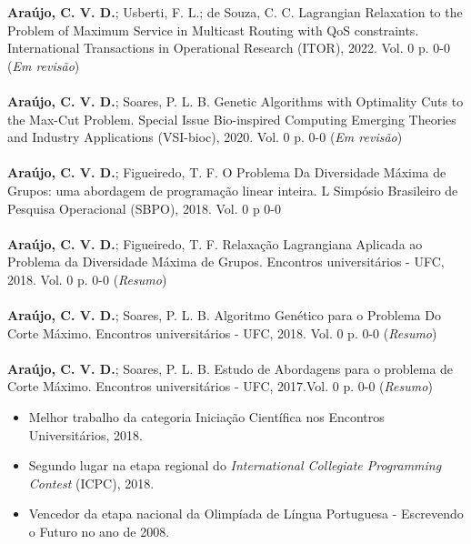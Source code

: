 \documentclass[10pt,a4paper,ragged2e,withhyper]{altacv}
\begin{document}
\begin{paracol}{1}
        \medskip
    	    \textbf{Araújo, C. V. D.}; Usberti, F. L.; de Souza, C. C.
    	    \textcolor{SecondaryColor}{Lagrangian Relaxation to the Problem of Maximum Service in Multicast Routing with QoS constraints}. International Transactions in Operational Research (ITOR), 2022. Vol. 0 p. 0-0 (\emph{Em revisão}) \\
    	    \divider \\
    		\textbf{Araújo, C. V. D.}; Soares, P. L. B.
    	    \textcolor{SecondaryColor}{Genetic Algorithms with Optimality Cuts to the Max-Cut Problem}. Special Issue Bio-inspired Computing Emerging Theories and Industry Applications (VSI-bioc), 2020. Vol. 0 p. 0-0 (\emph{Em revisão}) \\
    	    \divider \\
    	    \textbf{Araújo, C. V. D.}; Figueiredo, T. F.
    	    \textcolor{SecondaryColor}{O Problema Da Diversidade Máxima de Grupos: uma abordagem de programação linear inteira}.  L Simpósio Brasileiro de Pesquisa Operacional (SBPO), 2018. Vol. 0 p 0-0 \\
    		\divider \\
    		\textbf{Araújo, C. V. D.}; Figueiredo, T. F.
    		\textcolor{SecondaryColor}{Relaxação Lagrangiana Aplicada ao Problema da Diversidade Máxima de Grupos}. Encontros universitários - UFC, 2018. Vol. 0 p. 0-0 (\emph{Resumo}) \\
    		\divider \\
    		\textbf{Araújo, C. V. D.}; Soares, P. L. B. 
    		\textcolor{SecondaryColor}{Algoritmo Genético para o Problema Do Corte Máximo}. Encontros universitários - UFC, 2018. Vol. 0 p. 0-0 (\emph{Resumo}) \\
            \divider \\
            \textbf{Araújo, C. V. D.}; Soares, P. L. B.
            \textcolor{SecondaryColor}{Estudo de Abordagens para o problema de Corte Máximo}. Encontros universitários  - UFC, 2017.Vol. 0 p. 0-0 (\emph{Resumo}) \\
	    \medskip
        \begin{itemize}
            \item Melhor trabalho da categoria Iniciação Científica nos \textcolor{SecondaryColor}{Encontros Universitários, 2018}.
            \item Segundo lugar na etapa regional do \textcolor{SecondaryColor}{\textit{International Collegiate Programming Contest} (ICPC), 2018}.
            \item Vencedor da etapa nacional da \textcolor{SecondaryColor}{Olimpíada de Língua Portuguesa - Escrevendo o Futuro no ano de 2008}.     
        \end{itemize}
    \end{paracol}
\end{document}
